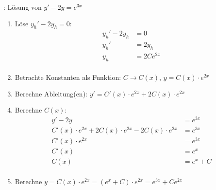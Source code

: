 \begin{minipage}{\linewidth}
\Bsp {}: Lösung von $y' - 2y = e^{3x}$
\begin{enumerate}
    \item Löse $y_h' - 2y_h = 0$:
        \begin{align*}
            y_h' - 2y_h &= 0 \\[-0.6em]
            y_h' &= 2y_h \\[-0.6em]
            y_h &= 2Ce^{2x} \\[-0.6em]
        \end{align*}
    \item Betrachte Konstanten als Funktion: $C \to C(x)$, $y = C(x) \cdot e^{2x}$
    \item Berechne Ableitung(en): $y' = C'(x) \cdot e^{2x} + 2 C(x) \cdot e^{2x}$
    \item Berechne $C(x)$:
        \vspace{-0.6em}
        \begin{align*}
            y' - 2y &= e^{3x} \\[-0.6em]
            C'(x) \cdot e^{2x} + 2 C(x) \cdot e^{2x} - 2C(x) \cdot e^{2x} &= e^{3x} \\[-0.6em]
            C'(x) \cdot e^{2x} &= e^{3x} \\[-0.6em]
            C'(x) &= e^x \\[-0.6em]
            C(x) &= e^x + C \\[-0.6em]
        \end{align*}
    \item Berechne $y = C(x) \cdot e^{2x} = (e^x + C) \cdot e^{2x} = e^{3x} + Ce^{2x}$
\end{enumerate}
\end{minipage}

